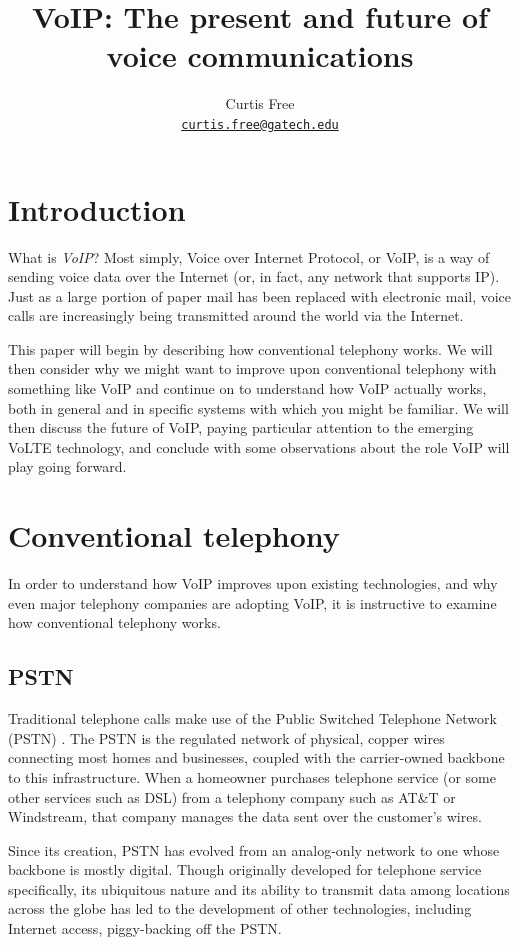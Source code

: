 \documentclass[11pt]{article}
\title{VoIP: The present and future of voice communications}
\date{}
\author{
	\begin{tabular}{ c c c }
	Curtis Free \\
	\small \href{mailto:curtis.free@gatech.edu}{\nolinkurl{curtis.free@gatech.edu}} &
	\end{tabular}
}
\newcommand{\term}[1]{\textit{#1}}
\begin{document}
\maketitle

\section{Introduction}

What is \term{VoIP}? Most simply, Voice over Internet Protocol, or VoIP, is a
way of sending voice data over the Internet (or, in fact, any network that
supports IP). Just as a large portion of paper mail has been replaced with
electronic mail, voice calls are increasingly being transmitted around the world
via the Internet.

This paper will begin by describing how conventional telephony works. We will
then consider why we might want to improve upon conventional telephony with
something like VoIP and continue on to understand how VoIP actually works, both
in general and in specific systems with which you might be familiar. We will
then discuss the future of VoIP, paying particular attention to the emerging
VoLTE technology, and conclude with some observations about the role VoIP will
play going forward.

\section{Conventional telephony}

In order to understand how VoIP improves upon existing technologies, and why
even major telephony companies are adopting VoIP, it is instructive to examine
how conventional telephony works.

\subsection{PSTN}

Traditional telephone calls make use of the Public Switched Telephone Network
(PSTN) \cite{howstuffworks}. The PSTN is the regulated network of physical,
copper wires connecting most homes and businesses, coupled with the
carrier-owned backbone to this infrastructure. When a homeowner purchases
telephone service (or some other services such as DSL) from a telephony company
such as AT\&T or Windstream, that company manages the data sent over the
customer's wires. \cite{about}

Since its creation, PSTN has evolved from an analog-only network to one whose
backbone is mostly digital. Though originally developed for telephone service
specifically, its ubiquitous nature and its ability to transmit data among
locations across the globe has led to the development of other technologies,
including Internet access, piggy-backing off the PSTN. \cite{linfo}
\end{document}
